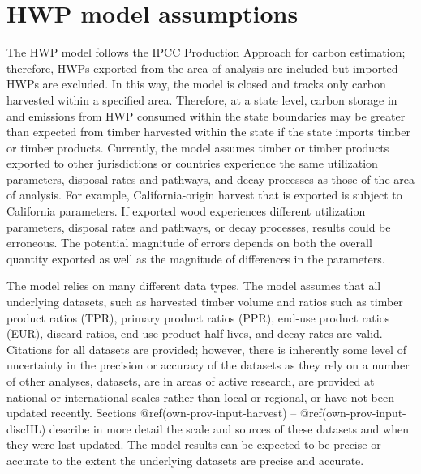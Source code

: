 \documentclass[
  openany]{book}
\begin{document}
\hypertarget{int-assump}{%
\section{HWP model assumptions}\label{int-assump}}

The HWP model follows the IPCC Production Approach for carbon
estimation; therefore, HWPs exported from the area of analysis are
included but imported HWPs are excluded. In this way, the model is
closed and tracks only carbon harvested within a specified area.
Therefore, at a state level, carbon storage in and emissions from HWP
consumed within the state boundaries may be greater than expected from
timber harvested within the state if the state imports timber or timber
products. Currently, the model assumes timber or timber products
exported to other jurisdictions or countries experience the same
utilization parameters, disposal rates and pathways, and decay processes
as those of the area of analysis. For example, California-origin harvest
that is exported is subject to California parameters. If exported wood
experiences different utilization parameters, disposal rates and
pathways, or decay processes, results could be erroneous. The potential
magnitude of errors depends on both the overall quantity exported as
well as the magnitude of differences in the parameters.

The model relies on many different data types. The model assumes that
all underlying datasets, such as harvested timber volume and ratios such
as timber product ratios (TPR), primary product ratios (PPR), end-use
product ratios (EUR), discard ratios, end-use product half-lives, and
decay rates are valid. Citations for all datasets are provided; however,
there is inherently some level of uncertainty in the precision or
accuracy of the datasets as they rely on a number of other analyses,
datasets, are in areas of active research, are provided at national or
international scales rather than local or regional, or have not been
updated recently. Sections @ref(own-prov-input-harvest) --
@ref(own-prov-input-discHL) describe in more detail the scale and
sources of these datasets and when they were last updated. The model
results can be expected to be precise or accurate to the extent the
underlying datasets are precise and accurate.
\end{document}
